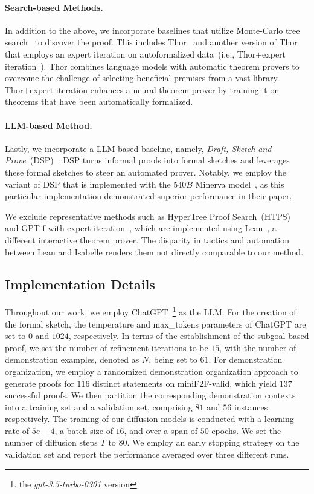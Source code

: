 \documentclass{article}
\begin{document}
\paragraph{Search-based Methods.}

In addition to the above, we incorporate baselines that utilize Monte-Carlo tree search~\cite{silver2016mastering} to discover the proof. This includes Thor~\cite{jiang2022thor} and another version of Thor that employs an expert iteration on autoformalized data~(i.e., Thor+expert iteration~\cite{wu2022autoformalization}). Thor combines language models with automatic theorem provers to overcome the challenge of selecting beneficial premises from a vast library. Thor+expert iteration enhances a neural theorem prover by training it on theorems that have been automatically formalized.



\paragraph{LLM-based Method.}

Lastly, we incorporate a LLM-based baseline, namely, \emph{Draft, Sketch and Prove}~(DSP)~\cite{jiang2022draft}. DSP turns informal proofs into formal sketches and leverages these formal sketches to steer an automated prover. Notably, we employ the variant of DSP that is implemented with the $540B$ Minerva model~\cite{lewkowycz2022solving}, as this particular implementation demonstrated superior performance in their paper.

We exclude representative methods such as HyperTree Proof Search~(HTPS)~\cite{lample2022hypertree} and GPT-f with expert iteration~\cite{polu2022formal}, which are implemented using Lean~\cite{de2015lean}, a different interactive theorem prover. The disparity in tactics and automation between Lean and Isabelle renders them not directly comparable to our method.

\subsection{Implementation Details}
Throughout our work, we employ ChatGPT~\footnote{the \textit{gpt-3.5-turbo-0301} version} as the LLM. For the creation of the formal sketch, the temperature and max\_tokens
parameters of ChatGPT are set to $0$ and $1024$, respectively. 
In terms of the establishment of the subgoal-based proof, we set the number of refinement iterations to be $15$, with the number of demonstration examples, denoted as $N$, being set to $61$.
For demonstration organization, we employ a randomized demonstration organization approach to generate proofs for $116$ distinct statements on miniF2F-valid, which yield $137$ successful proofs. We then partition the corresponding demonstration contexts into a training set and a validation set, comprising $81$ and $56$ instances respectively. The training of our diffusion models is conducted with a learning rate of $5e-4$, a batch size of $16$, and over a span of $50$ epochs.
We set the number of diffusion steps $T$ to $80$. We employ an early stopping strategy on the validation set and report the performance averaged over three different runs.
\end{document}
